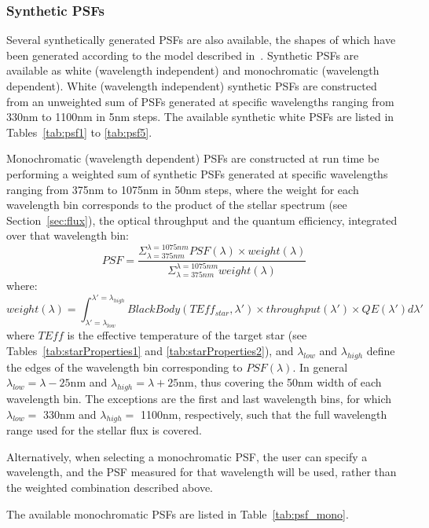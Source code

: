 \documentclass[11pt]{article}      %
\begin{document}
\clearpage

\subsubsection{Synthetic PSFs}

Several synthetically generated PSFs are also available, the shapes of which have been generated according to the model described in~\cite{opticalModel}. Synthetic PSFs are available as white (wavelength independent) and monochromatic (wavelength dependent). White (wavelength independent) synthetic PSFs are constructed from an unweighted sum of PSFs generated at specific wavelengths ranging from 330nm to 1100nm in 5nm steps. The available synthetic white PSFs are listed in Tables~\ref{tab:psf1} to \ref{tab:psf5}.

Monochromatic (wavelength dependent) PSFs are constructed at run time be performing a weighted sum of synthetic PSFs generated at specific wavelengths ranging from 375nm to 1075nm in 50nm steps, where the weight for each wavelength bin corresponds to the product of the stellar spectrum (see Section~\ref{sec:flux}), the optical throughput and the quantum efficiency, integrated over that wavelength bin:
$$PSF = \frac{\Sigma_{\lambda=375nm}^{\lambda=1075nm}{PSF(\lambda) \times weight(\lambda)}}{\Sigma_{\lambda=375nm}^{\lambda=1075nm}{weight(\lambda)}}$$
where:
$$weight(\lambda) = \int_{\lambda'=\lambda_{low}}^{\lambda'=\lambda_{high}}{BlackBody(TEff_{star},\lambda') \times throughput(\lambda') \times QE(\lambda')d\lambda'}$$
where $TEff$ is the effective temperature of the target star (see Tables~\ref{tab:starProperties1} and \ref{tab:starProperties2}), and $\lambda_{low}$ and $\lambda_{high}$ define the edges of the wavelength bin corresponding to $PSF(\lambda)$. In general $\lambda_{low}=\lambda -25$nm and $\lambda_{high}=\lambda+25$nm, thus covering the 50nm width of each wavelength bin. The exceptions are the first and last wavelength bins, for which $\lambda_{low}=$ 330nm and $\lambda_{high}=$ 1100nm, respectively, such that the full wavelength range used for the stellar flux is covered.

Alternatively, when selecting a monochromatic PSF, the user can specify a wavelength, and the PSF measured for that wavelength will be used, rather than the weighted combination described above.

The available monochromatic PSFs are listed in Table~\ref{tab:psf_mono}.
\end{document}
